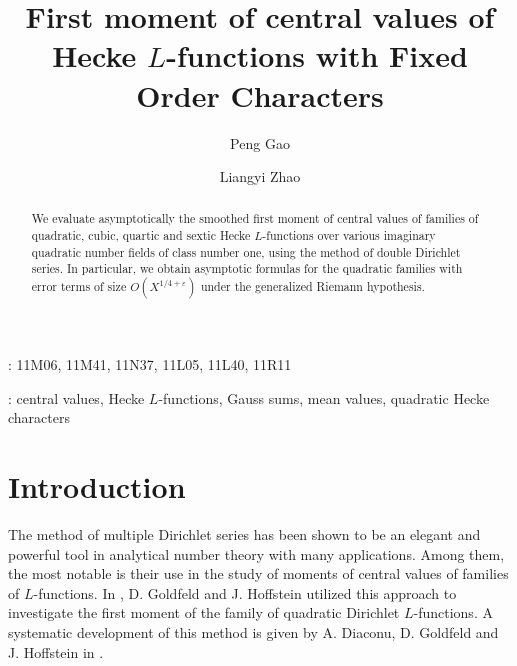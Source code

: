 \documentclass[twoside,leqno,10pt, A4]{amsart}
\begin{document}
\title[First moment of central values of Hecke $L$-functions with Fixed Order Characters]{First moment of central values of Hecke $L$-functions with Fixed Order Characters}


\author[P. Gao]{Peng Gao}
\address{School of Mathematical Sciences, Beihang University, Beijing 100191, China}

\author[L. Zhao]{Liangyi Zhao}
\address{School of Mathematics and Statistics, University of New South Wales, Sydney, NSW 2052, Australia}

\begin{abstract}
 We evaluate asymptotically the smoothed first moment of central values of families of quadratic, cubic, quartic and sextic Hecke $L$-functions over various imaginary quadratic number fields of class number one, using the method of double Dirichlet series. In particular, we obtain asymptotic formulas for the quadratic families with error terms of size $O(X^{1/4+\varepsilon})$ under the generalized Riemann hypothesis.
\end{abstract}

\maketitle

: 11M06, 11M41, 11N37, 11L05, 11L40, 11R11   \newline

:  central values, Hecke $L$-functions, Gauss sums, mean values, quadratic Hecke characters

\section{Introduction}
\label{sec 1}

The method of multiple Dirichlet series has been shown to be an elegant and powerful tool in analytical number theory with many
applications.  Among them, the most notable is their use in the study of moments of central values of families of $L$-functions.  In \cite{DoHo}, D. Goldfeld and J. Hoffstein utilized this approach to investigate the first moment of the family of quadratic Dirichlet $L$-functions. A systematic development of this method is given
by A. Diaconu, D. Goldfeld and J. Hoffstein in \cite{DGH}. \newline
\end{document}
